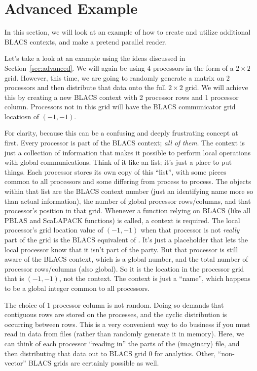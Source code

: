 \section{Advanced Example}\label{sec:eg2}

In this section, we will look at an example of how to create and utilize additional BLACS contexts, and make a pretend parallel reader.

Let's take a look at an example using the ideas discussed in Section~\ref{sec:advanced}.  We will again be using 4 processors in the form of a $2\times 2$ grid.  However, this time, we are going to randomly generate a matrix on 2 processors and then distribute that data onto the full $2\times 2$ grid.  We will achieve this by creating a new BLACS context with 2 processor rows and 1 processor column.  Processors not in this grid will have the BLACS communicator grid locatiosn of $(-1, -1)$. 

For clarity, because this can be a confusing and deeply frustrating concept at first.  Every processor is part of the BLACS context; \emph{all of them}.  The context is just a collection of information that makes it possible to perform local operations with global communications.  Think of it like an  list; it's just a place to put things.  Each processor stores its own copy of this ``list'', with some pieces common to all processors and some differing from process to process.  The objects within that list are the BLACS context number (just an identifying name more so than actual information), the number of global processor rows/columns, and that processor's position in that grid.  Whenever a function relying on BLACS (like all PBLAS and ScaLAPACK functions) is called, a context is required.  The local processor's grid location value of $(-1, -1)$ when that processor is not \emph{really} part of the grid is the BLACS equivalent of .  It's just a placeholder that lets the local 
processor know that it isn't part of the party.  But that processor is still aware of the BLACS context, which is a global number, and the total number of processor rows/columns (also global).  So it is the location in the processor grid that is $(-1, -1)$, not the context.  The context is just a ``name'', which happens to be a global integer common to all processors.

The choice of 1 processor column is not random.  Doing so demands that contiguous rows are stored on the processes, and the cyclic distribution is occurring between rows.  This is a very convenient way to do business if you must read in data from files (rather than randomly generate it in memory).  Here, we can think of each processor ``reading in'' the parts of the (imaginary) file, and then distributing that data out to BLACS grid 0 for analytics.  Other, ``non-vector'' BLACS grids are certainly possible as well.

